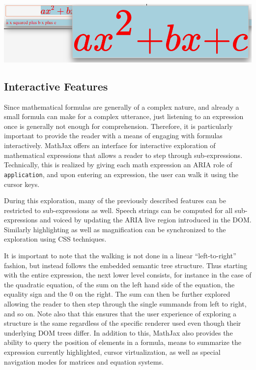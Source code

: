 \documentclass{sig-alternate}
\begin{document}
\begin{center}
  \includegraphics[width=.7\linewidth]{magnification}  
\end{center}


\subsection{Interactive Features}

Since mathematical formulas are generally of a complex nature, and already a
small formula can make for a complex utterance, just listening to an expression
once is generally not enough for comprehension. Therefore, it is particularly
important to provide the reader with a means of engaging with formulas
interactively. MathJax offers an interface for interactive exploration of
mathematical expressions that allows a reader to step through sub-expressions.
Technically, this is realized by giving each math expression an ARIA role of
\texttt{application}, and upon entering an expression, the user can walk it
using the cursor keys.

During this exploration, many of the previously described features can be
restricted to sub-expressions as well. Speech strings can be
computed for all sub-expressions and voiced by updating the ARIA live region
introduced in the DOM. Similarly highlighting as well as magnification can be
synchronized to the exploration using CSS techniques.

It is important to note that the walking is not done in a linear
``left-to-right'' fashion, but instead follows the embedded semantic tree
structure. Thus starting with the entire expression, the next lower level
consists, for instance in the case of the quadratic equation, of the sum on the
left hand side of the equation, the equality sign and the $0$ on the right.  The
sum can then be further explored allowing the reader to then step through the
single summands from left to right, and so on.  Note also that this
ensures that the user experience of exploring a structure is the same regardless
of the specific renderer used even though their underlying DOM trees differ.
In addition to this, MathJax also provides the ability to
query the position of elements in a formula, means to summarize the expression currently
highlighted, cursor virtualization, as well as special navigation modes for
matrices and equation systems.
\end{document}
